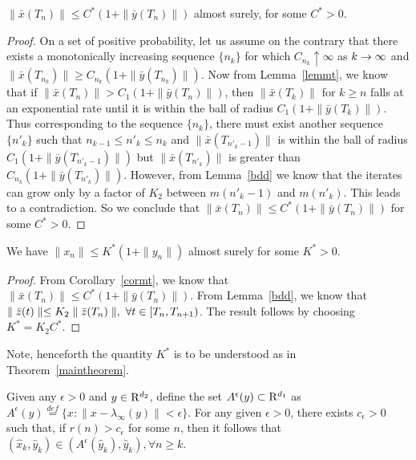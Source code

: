 \begin{corollary}\label{cormt}
$\parallel \bar{x}(T_n)\parallel \leq C^*(1+\parallel \bar{y}(T_n)\parallel)$ almost surely, for some $C^*>0$.
\end{corollary}
\begin{proof}
On a set of positive probability, let us assume on the contrary that 
there exists a monotonically increasing sequence $\{n_k\}$ for which $C_{n_k} \uparrow \infty$ 
as $k\rightarrow \infty$ and $\parallel \bar{x}(T_{n_k})\parallel \geq C_{n_k}(1+\parallel \bar{y}(T_{n_k})
\parallel)$. Now from Lemma~\ref{lemmt}, we know that if $\parallel \bar{x}(T_n)\parallel>C_1(1+
\parallel \bar{y}(T_n)\parallel)$, then $\parallel \bar{x}(T_k)\parallel$ for $k\geq n$ falls at an 
exponential rate until it is within the ball of radius $C_1(1+\parallel \bar{y}(T_k)\parallel)$. 
Thus corresponding to the sequence $\{n_k\}$, there must exist another sequence $\{n'_k\}$ such that 
$n_{k-1}\leq n'_k\leq n_k$ and $\parallel \bar{x}(T_{n'_k-1})\parallel$ is within the ball of radius 
$C_1(1+\parallel \bar{y}(T_{n'_k-1})\parallel)$ but $\parallel \bar{x}(T_{n'_k})\parallel$ is greater 
than $C_{n_k}(1+\parallel \bar{y}(T_{n'_k})\parallel)$. However, from Lemma~\ref{bdd} we know that the iterates can grow only by a factor of $K_2$ between $m(n'_k-1)$ and $m(n'_k)$. This leads to a contradiction. 
So we conclude that $\parallel \bar{x}(T_n)\parallel \leq C^*(1+\parallel \bar{y}(T_n)\parallel)$ 
for some $C^*>0$.
\end{proof}
\begin{theorem}\label{maintheorem}
We have $\parallel x_n\parallel \leq K^*(1+\parallel y_n\parallel)$ almost surely for some $K^*>0$.
\end{theorem}
\begin{proof}
From Corollary~\ref{cormt}, we know that $\parallel \bar{x}(T_n)\parallel \leq C^*(1+\parallel \bar{y}(T_n)
\parallel)$. From Lemma~\ref{bdd}, we know that $\parallel \bar{z}(t)\parallel \leq K_2 \parallel \bar{z}(T_n)
\parallel, \mbox{ }\forall t\in [T_n,T_{n+1})$. The result follows by choosing $K^*=K_2C^*$.
\end{proof}
Note, henceforth the quantity $K^*$ is to be understood as in Theorem~\ref{maintheorem}.
\begin{theorem}\label{ftsres}
Given any $\epsilon>0$ and $y\in \mathrm{R}^{d_2}$, define the set $A^{\epsilon}(y)\subset \mathrm{R}^{d_1}$ as 
$A^{\epsilon}(y)\stackrel{def}{=}\{x\colon \parallel x-\lambda_\infty(y)\parallel <\epsilon\}$. For any 
given $\epsilon>0$, there exists $c_{\epsilon}>0$ such that, if $r(n)>c_\epsilon$ for some $n$, then it follows that $(\hat{x}_{k},\hat{y}_{k}) \in (A^\epsilon(\hat{y}_{k}),\hat{y}_{k}), \forall n\geq k$.
\end{theorem}
